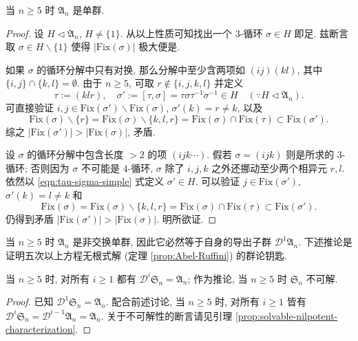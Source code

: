 \begin{theorem}[É.\ Galois]\label{prop:A_n-simple}
	当 $n \geq 5$ 时 $\mathfrak{A}_n$ 是单群.
\end{theorem}
\begin{proof}
	设 $H \lhd \mathfrak{A}_n$, $H \neq \{1\}$. 从以上性质可知找出一个 $3$-循环 $\sigma \in H$ 即足. 兹断言取 $\sigma \in H \smallsetminus \{1\}$ 使得 $\left|\text{Fix}(\sigma)\right|$ 极大便是.
	
	如果 $\sigma$ 的循环分解中只有对换, 那么分解中至少含两项如 $(i j) (k l)$, 其中 $\{i,j\} \cap \{k,l\} = \emptyset$. 由于 $n \geq 5$, 可取 $r \notin \{i,j,k, l\}$ 并定义
	\begin{equation}\label{eqn:tau-sigma-simple}
		\tau := (k l r), \quad \sigma' := [\tau, \sigma] = \tau\sigma\tau^{-1}\sigma^{-1} \in H \quad (\because H \lhd \mathfrak{A}_n).
	\end{equation}
	可直接验证 $i,j \in \text{Fix}(\sigma') \smallsetminus \text{Fix}(\sigma)$, $\sigma'(k) = r \neq k$, 以及
	\[ \text{Fix}(\sigma) \smallsetminus \{r\} = \text{Fix}(\sigma) \smallsetminus \{k, l, r\} = \text{Fix}(\sigma) \cap \text{Fix}(\tau) \subset \text{Fix}(\sigma'). \]
	综之 $\left|\text{Fix}(\sigma')\right| > \left|\mathrm{Fix}(\sigma)\right|$, 矛盾.
	
	设 $\sigma$ 的循环分解中包含长度 $>2$ 的项 $(i j k \cdots)$. 假若 $\sigma = (i j k)$ 则是所求的 $3$-循环; 否则因为 $\sigma$ 不可能是 $4$-循环, $\sigma$ 除了 $i,j,k$ 之外还挪动至少两个相异元 $r, l$. 依然以 \eqref{eqn:tau-sigma-simple} 式定义 $\sigma' \in H$. 可以验证 $j \in \text{Fix}(\sigma')$, $\sigma'(k) = l \neq k$ 和
	\[ \text{Fix}(\sigma) = \text{Fix}(\sigma) \smallsetminus \{k,l,r\} = \text{Fix}(\sigma) \cap \text{Fix}(\tau) \subset \text{Fix}(\sigma'). \]
	仍得到矛盾 $\left|\text{Fix}(\sigma')\right| > \left|\mathrm{Fix}(\sigma)\right|$. 明所欲证.
\end{proof}

当 $n \geq 5$ 时 $\mathfrak{A}_n$ 是非交换单群, 因此它必然等于自身的导出子群 $\mathscr{D}^1 \mathfrak{A}_n$. 下述推论是证明五次以上方程无根式解 (定理 \ref{prop:Abel-Ruffini}) 的群论钥匙.
\begin{corollary}\label{prop:S_n-unsolvable}
	当 $n \geq 5$ 时, 对所有 $i \geq 1$ 都有 $\mathscr{D}^i \mathfrak{S}_n = \mathfrak{A}_n$; 作为推论, 当 $n \geq 5$ 时 $\mathfrak{S}_n$ 不可解.
\end{corollary}
\begin{proof}
	已知 $\mathscr{D}^1 \mathfrak{S}_n = \mathfrak{A}_n$. 配合前述讨论, 当 $n \geq 5$ 时, 对所有 $i \geq 1$ 皆有 $\mathscr{D}^i \mathfrak{S}_n = \mathscr{D}^{i-1} \mathfrak{A}_n = \mathfrak{A}_n$. 关于不可解性的断言请见引理 \ref{prop:solvable-nilpotent-characterization}.
\end{proof}

